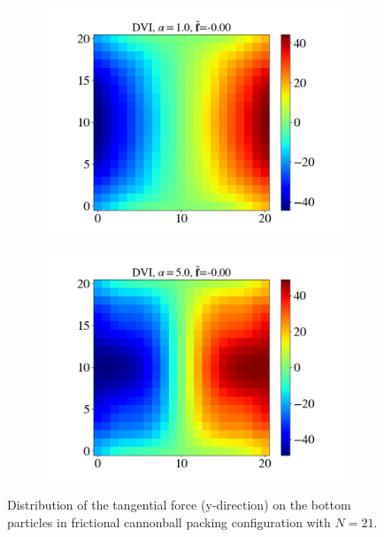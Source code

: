 \begin{itemize}
\begin{figure}[H]
\begin{subfigure}{0.32\columnwidth}
			\includegraphics[width=1.0\textwidth]{images/CD/Example7/20/T2_21_DVI_1.0.png}
		\end{subfigure}
		\begin{subfigure}{0.32\columnwidth}	
			\centering
			\includegraphics[width=1.0\textwidth]{images/CD/Example7/20/T2_21_DVI_5.0.png}
		\end{subfigure}
		\caption{Distribution of the tangential force (y-direction) on the bottom particles in frictional cannonball packing configuration with $N=21$.}\label{fig:cbp_fp_T2=21}
	\end{figure}
\end{itemize}

